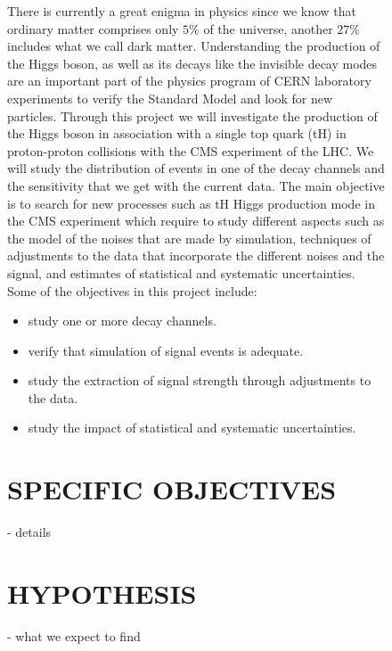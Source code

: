 \documentclass[final,3p]{CSP}
\begin{document}
\begin{figure}
There is currently a great enigma in physics since we know that ordinary matter comprises 
only $5\%$ of the universe, another 
$27\%$ includes what we call dark matter. Understanding the production of the Higgs boson, as 
well as its decays like the invisible decay modes are an important part of the physics 
program of CERN laboratory experiments to verify the Standard Model and look for new 
particles. Through this project we will investigate the production of the Higgs boson in 
association with a single top quark (tH) in proton-proton collisions with the CMS experiment 
of the LHC. We will study the distribution of events in one of the decay channels and the 
sensitivity that we get with the current data. The main objective is to search for new 
processes such as tH Higgs production mode in the CMS experiment which require to study 
different aspects such as the model of the noises that are made by simulation, techniques of 
adjustments to the data that incorporate the different noises and the signal, and estimates 
of statistical and systematic uncertainties.
Some of the objectives in this project include:\\
\begin{itemize}
\item study one or more decay channels.\\
\item verify that simulation of signal events is adequate.\\
\item study the extraction of signal strength through adjustments to the data.\\
\item study the impact of statistical and systematic uncertainties.\\
\end{itemize}

\section{SPECIFIC OBJECTIVES}
- details 

\section{HYPOTHESIS}
- what we expect to find


\end{figure}
\end{document}
